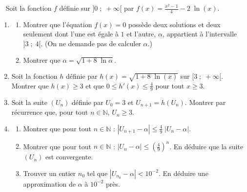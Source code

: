 \begin{exo} ~ \newline
\label{exo:el point fixe racine}
Soit la fonction $f$ d\'efinie sur $]0 \; ; \; +\infty[$ par $f(x) = \frac{x^2 - 1}{4} - 2 \; \ln (x)$.
\begin{enumerate}
\item \begin{enumerate}
      \item Montrer que l'\'equation $f(x) = 0$ poss\`ede deux solutions et deux seulement
            dont l'une est \'egale \`a $1$ et l'autre, $\alpha$, appartient \`a l'intervalle $]3 \; ; \; 4[$.
            (On ne demande pas de calculer $\alpha$.)
      \item Montrer que $\alpha = \sqrt{1 + 8 \; \ln \alpha}$.
      \end{enumerate}
\item Soit la fonction $h$ d\'efinie par $h(x) = \sqrt{1 + 8 \; \ln (x)}$ sur $[3 \; ; \; +\infty[$.
      Montrer que $h(x) \geq 3$ et que $0 \leq h'(x) \leq \frac{4}{9}$ pour tout $x \geq 3$.
\item Soit la suite $(U_n)$ d\'efinie par $U_0 = 3$ et $U_{n+1} = h(U_n)$.
      Montrer par r\'ecurrence que, pour tout $n \in \mathbb{N}$, $U_n \geq 3$.
\item \begin{enumerate}
      \item Montrer que pour tout $n \in \mathbb{N}$ :
            $\left| U_{n+1} - \alpha \right| \leq \frac{4}{9} \; \left| U_n - \alpha \right| $.
      \item Montrer que pour tout $n \in \mathbb{N}$ :
            $\left| U_n - \alpha \right| \leq \left( \frac{4}{9} \right)^n $.
            En d\'eduire que la suite $(U_n)$ est convergente.
      \item Trouver un entier $n_0$ tel que $\left| U_{n_0} - \alpha \right| < 10^{-2}$.
            En d\'eduire une approximation de $\alpha$ \`a $10^{-2}$ pr\`es.
      \end{enumerate}
\end{enumerate}
\end{exo}
